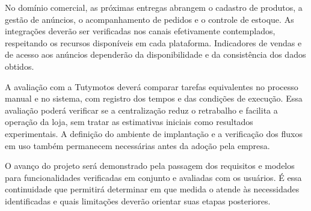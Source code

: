 No domínio comercial, as próximas entregas abrangem o cadastro de produtos, a gestão de anúncios, o acompanhamento de pedidos e o controle de estoque. As integrações deverão ser verificadas nos canais efetivamente contemplados, respeitando os recursos disponíveis em cada plataforma. Indicadores de vendas e de acesso aos anúncios dependerão da disponibilidade e da consistência dos dados obtidos.

\begin{samepage}
A avaliação com a Tutymotos deverá comparar tarefas equivalentes no processo manual e no sistema, com registro dos tempos e das condições de execução. Essa avaliação poderá verificar se a centralização reduz o retrabalho e facilita a operação da loja, sem tratar as estimativas iniciais como resultados experimentais. A definição do ambiente de implantação e a verificação dos fluxos em uso também permanecem necessárias antes da adoção pela empresa.

\end{samepage}

O avanço do projeto será demonstrado pela passagem dos requisitos e modelos para funcionalidades verificadas em conjunto e avaliadas com os usuários. É essa continuidade que permitirá determinar em que medida o \sistema{} atende às necessidades identificadas e quais limitações deverão orientar suas etapas posteriores.
